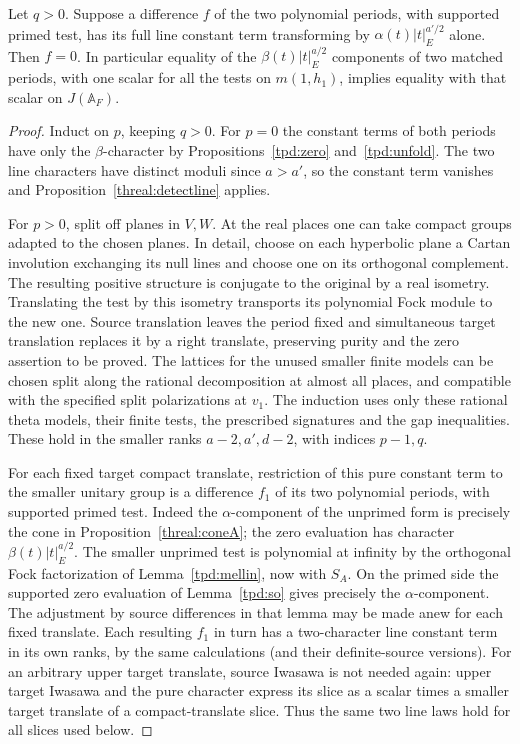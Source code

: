 \begin{proposition}\label{threal:endB}
Let \(q>0\). Suppose a difference \(f\) of the two polynomial
periods, with supported primed test, has its full line constant
term transforming by \(\alpha(t)|t|_E^{a'/2}\) alone. Then \(f=0\).
In particular equality of the \(\beta(t)|t|_E^{a/2}\) components
of two matched periods, with one scalar for all the tests on
\(m(1,h_1)\), implies equality with that scalar on \(J(\mathbb A_F)\).
\end{proposition}
\begin{proof}
Induct on \(p\), keeping \(q>0\). For \(p=0\) the constant terms
of both periods have only the \(\beta\)-character by
Propositions~\ref{tpd:zero} and~\ref{tpd:unfold}. The two line
characters have distinct moduli since \(a>a'\), so the constant
term vanishes and Proposition~\ref{threal:detectline} applies.

For \(p>0\), split off planes in \(V,W\). At the real places one
can take compact groups adapted to the chosen planes. In detail,
choose on each hyperbolic plane a Cartan involution exchanging its
null lines and choose one on its orthogonal complement. The
resulting positive structure is conjugate to the original by a
real isometry. Translating the test by this isometry transports its
polynomial Fock module to the new one. Source translation leaves
the period fixed and simultaneous target translation replaces it
by a right translate, preserving purity and the zero assertion
to be proved. The lattices for the unused smaller finite models
can be chosen split along the rational decomposition at almost all
places, and compatible with the specified split polarizations at
\(v_1\). The induction uses only these rational theta models, their
finite tests, the prescribed signatures and the gap inequalities.
These hold in the smaller ranks \(a-2,a',d-2\), with indices
\(p-1,q\).

For each fixed target compact translate, restriction of this
pure constant term to the smaller unitary group is a difference
\(f_1\) of its two polynomial periods, with supported primed test.
Indeed the \(\alpha\)-component of the unprimed form is precisely
the cone in Proposition~\ref{threal:coneA}; the zero evaluation
has character \(\beta(t)|t|^{a/2}_E\). The smaller unprimed test
is polynomial at infinity by the orthogonal Fock factorization
of Lemma~\ref{tpd:mellin}, now with \(S_A\).
On the primed side the supported zero evaluation of
Lemma~\ref{tpd:so} gives precisely the \(\alpha\)-component.
The adjustment by source differences in that lemma may be made
anew for each fixed translate. Each resulting \(f_1\) in turn
has a two-character line constant term in its own ranks, by the
same calculations (and their definite-source versions). For an
arbitrary upper target translate, source Iwasawa is not needed
again: upper target Iwasawa and the pure character express its
slice as a scalar times a smaller target translate of a
compact-translate slice. Thus the same two line laws hold for all
slices used below.


\end{proof}

